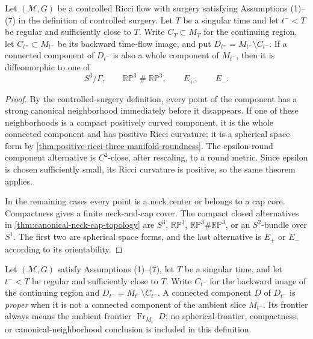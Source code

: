 \begin{lemma}
\label{lem:whole-disappearing-component-classification}
\notready
Let $({\mathcal M},G)$ be a controlled Ricci flow with surgery satisfying
Assumptions (1)--(7) in the definition of controlled surgery.  Let $T$ be a
singular time and let $t^-<T$ be regular and sufficiently close to $T$.  Write
$C_T\subset M_T$ for the continuing region, let
$C_{t^-}\subset M_{t^-}$ be its backward time-flow image, and put
$D_{t^-}=M_{t^-}\setminus C_{t^-}$.  If a connected component of $D_{t^-}$ is
also a whole component of $M_{t^-}$, then it is diffeomorphic
to one of
\[
 S^3/\Gamma,\qquad \mathbb{RP}^3\mathbin{\#}\mathbb{RP}^3,
 \qquad E_+,
 \qquad E_-.
\]
\end{lemma}

\begin{proof}
By the controlled-surgery definition, every point of the component has a
strong canonical neighborhood immediately before it disappears.  If one of
these neighborhoods is a compact positively curved component, it is the
whole connected component and has positive Ricci curvature; it is a
spherical space form by
\ref{thm:positive-ricci-three-manifold-roundness}.  The epsilon-round
component alternative is $C^2$-close, after rescaling, to a round metric.
Since epsilon is chosen sufficiently small, its Ricci curvature is positive,
so the same theorem applies.

In the remaining cases every point is a neck center or belongs to a cap core.
Compactness gives a finite neck-and-cap cover.  The compact closed
alternatives in \ref{thm:canonical-neck-cap-topology} are $S^3$,
$\mathbb{RP}^3$, $\mathbb{RP}^3\#\mathbb{RP}^3$, or an $S^2$-bundle over
$S^1$.  The first two are spherical space forms, and the last alternative is
$E_+$ or $E_-$ according to its orientability.
\end{proof}

\begin{definition}
\label{def:proper-disappearing-component}
\notready
Let $({\mathcal M},G)$ satisfy Assumptions (1)--(7), let $T$ be a singular
time, and let $t^-<T$ be regular and sufficiently close to $T$.  Write
$C_{t^-}$ for the backward image of the continuing region and
$D_{t^-}=M_{t^-}\setminus C_{t^-}$.  A connected component $D$ of
$D_{t^-}$ is \emph{proper} when it is not a connected component of the ambient
slice $M_{t^-}$.  Its frontier always means the ambient frontier
$\operatorname{Fr}_{M_{t^-}}D$; no spherical-frontier, compactness, or
canonical-neighborhood conclusion is included in this definition.
\end{definition}

